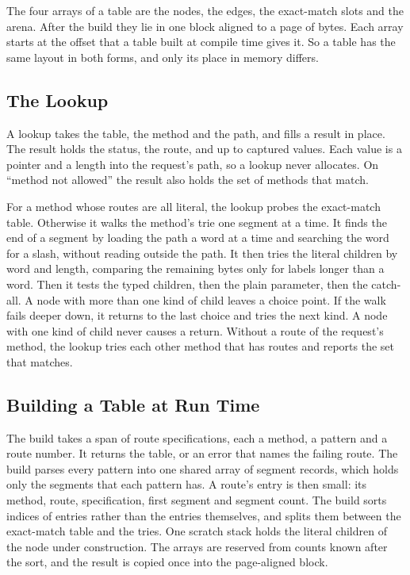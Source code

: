 The four arrays of a table are the nodes, the edges, the exact-match slots and the arena. After the
build they lie in one block aligned to a page of \VTwoPageBytes{} bytes. Each array starts at the
offset that a table built at compile time gives it. So a table has the same layout in both forms,
and only its place in memory differs.

\subsection{The Lookup}\label{sec:lookup}

A lookup takes the table, the method and the path, and fills a result in place. The result holds
the status, the route, and up to \VTwoMaxParams{} captured values. Each value is a pointer and a
length into the request's path, so a lookup never allocates. On ``method not allowed'' the result
also holds the set of methods that match.

For a method whose routes are all literal, the lookup probes the exact-match table. Otherwise it
walks the method's trie one segment at a time. It finds the end of a segment by loading the path a
word at a time and searching the word for a slash, without reading outside the path. It then tries
the literal children by word and length, comparing the remaining bytes only for labels longer than
a word. Then it tests the typed children, then the plain parameter, then the catch-all. A node with
more than one kind of child leaves a choice point. If the walk fails deeper down, it returns to the
last choice and tries the next kind. A node with one kind of child never causes a return. Without a
route of the request's method, the lookup tries each other method that has routes and reports the
set that matches.

\subsection{Building a Table at Run Time}\label{sec:build}

The build takes a span of route specifications, each a method, a pattern and a route number. It
returns the table, or an error that names the failing route. The build parses
every pattern into one shared array of segment records, which holds only the segments that each
pattern has. A route's entry is then small: its method, route, specification, first segment and
segment count. The build sorts indices of entries rather than the entries themselves, and splits
them between the exact-match table and the tries. One scratch stack holds the literal children of
the node under construction. The arrays are reserved from counts known after the sort, and the
result is copied once into the page-aligned block.

